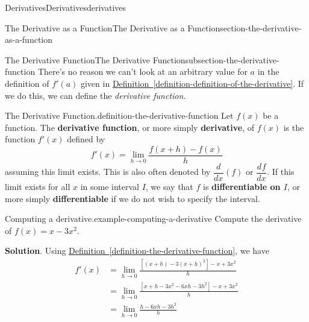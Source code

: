 \documentclass[oneside,10pt,]{book}
\newcommand{\terminology}[1]{\textbf{#1}}
\numberwithin{equation}{section}
\newcommand{\dv}[3][]{\dfrac{d^{#1} #2}{d #3^{#1}}}
\begin{document}
\begin{chapterptx}{Derivatives}{}{Derivatives}{}{}{derivatives}
%
%
\typeout{************************************************}
\typeout{************************************************}
%
\begin{sectionptx}{The Derivative as a Function}{}{The Derivative as a Function}{}{}{section-the-derivative-as-a-function}
%
%
\typeout{************************************************}
\typeout{************************************************}
%
\begin{subsectionptx}{The Derivative Function}{}{The Derivative Function}{}{}{subsection-the-derivative-function}
\hypertarget{p-100}{}%
There's no reason we can't look at an arbitrary value for \(a\) in the definition of \(f'(a)\) given in \hyperref[definition-definition-of-the-derivative]{Definition~\ref{definition-definition-of-the-derivative}}. If we do this, we can define the \emph{derivative function}.%
\begin{definition}{The Derivative Function.}{definition-the-derivative-function}%
\hypertarget{p-101}{}%
Let \(f(x)\) be a function. The \terminology{derivative function}, or more simply \terminology{derivative}, of \(f(x)\) is the function \(f'(x)\) defined by%
\begin{equation*}
f'(x) = \lim_{h\to0}\frac{f(x+h) - f(x)}{h}
\end{equation*}
assuming this limit exists. This is also often denoted by \(\dv{}{x}(f)\) or \(\dv{f}{x}\). If this limit exists for all \(x\) in some interval \(I\), we say that \(f\) is \terminology{differentiable on \(I\)}, or more simply \terminology{differentiable} if we do not wish to specify the interval.%
\end{definition}
\begin{example}{Computing a derivative.}{example-computing-a-derivative}%
\hypertarget{p-102}{}%
Compute the derivative of \(f(x) = x - 3x^{2}\).%
\par\smallskip%
\noindent\textbf{Solution}.\hypertarget{solution-22}{}\quad%
\hypertarget{p-103}{}%
Using \hyperref[definition-the-derivative-function]{Definition~\ref{definition-the-derivative-function}}, we have%
\begin{align*}
f'(x) & = \lim_{h\to0}\frac{[(x+h)-3(x+h)^{2}] - x + 3x^{2}}{h} \\
& = \lim_{h\to0}\frac{[x+h-3x^{2}-6xh-3h^{2}] - x + 3x^{2}}{h} \\
& = \lim_{h\to0}\frac{h-6xh-3h^{2}}{h} \\

\end{align*}
\end{example}
\end{subsectionptx}
\end{sectionptx}
\end{chapterptx}
\end{document}
